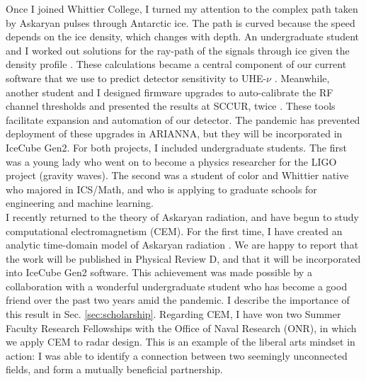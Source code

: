 \documentclass[../../main.tex]{subfiles}
\begin{document}
Once I joined Whittier College, I turned my attention to the complex path taken by Askaryan pulses through Antarctic ice.  The path is curved because the speed depends on the ice density, which changes with depth.  An undergraduate student and I worked out solutions for the ray-path of the signals through ice given the density profile \cite{Barwick:2018497}.  These calculations became a central component of our current software that we use to predict detector sensitivity to UHE-$\nu$ \cite{10.1140/epjc/s10052-020-7612-8} \cite{10.1140/epjc/s10052-019-6971-5}.  Meanwhile, another student and I designed firmware upgrades to auto-calibrate the RF channel thresholds and presented the results at SCCUR, twice \cite{sccur1} \cite{sccur2}.  These tools facilitate expansion and automation of our detector.  The pandemic has prevented deployment of these upgrades in ARIANNA, but they will be incorporated in IceCube Gen2.  For both projects, I included undergraduate students.  The first was a young lady who went on to become a physics researcher for the LIGO project (gravity waves).  The second was a student of color and Whittier native who majored in ICS/Math, and who is applying to graduate schools for engineering and machine learning.
\\
\vspace{0.25cm}
I recently returned to the theory of Askaryan radiation, and have begun to study computational electromagnetism (CEM).  For the first time, I have created an analytic time-domain model of Askaryan radiation \cite{time}.  We are happy to report that the work will be published in Physical Review D, and that it will be incorporated into IceCube Gen2 software.  This achievement was made possible by a collaboration with a wonderful undergraduate student who has become a good friend over the past two years amid the pandemic.  I describe the importance of this result in Sec. \ref{sec:scholarship}.  Regarding CEM, I have won two Summer Faculty Research Fellowships with the Office of Naval Research (ONR), in which we apply CEM to radar design.  This is an example of the liberal arts mindset in action: I was able to identify a connection between two seemingly unconnected fields, and form a mutually beneficial partnership.
\\
\vspace{0.25cm}
\end{document}
